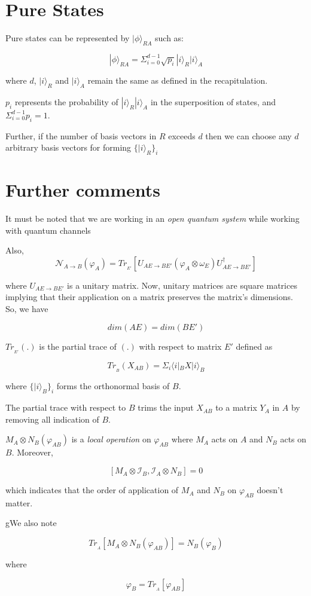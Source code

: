 \documentclass{article}
\begin{document}
\section{Pure States}

Pure states can be represented by $| \phi \rangle _{RA}$ such as:

\[| \phi \rangle _{RA} = \Sigma^{d-1}_{i=0} \sqrt{p_i}| i \rangle_R | i \rangle_A \]

where $d$, $| i \rangle_R$ and $| i \rangle_A$ remain the same as defined in the recapitulation. 

$p_i$ represents the probability of $| i \rangle_R | i \rangle_A$ in the superposition of states, and $\Sigma^{d-1}_{i=0} {p_i} = 1$.

\noindent Further, if the number of basis vectors in $R$ exceeds $d$ then we can choose any $d$ arbitrary basis vectors for forming 
$\{| i \rangle_R \}_i$

\section{Further comments}

\begin{description}

\item It must be noted that we are working in an \emph{open quantum system} while working with quantum channels

\item Also,
\[ \mathcal{N}_{A \rightarrow B}(\varphi_A) = Tr_{_{E'}}[U_{AE \rightarrow BE'} (\varphi_A \otimes \omega_E) U_{AE \rightarrow BE'}^{\dagger} ]\]

where $U_{AE \rightarrow BE'}$ is a unitary matrix. Now, unitary matrices are square matrices implying that their application on a matrix preserves the matrix's dimensions. So, we have

\[dim(AE) = dim(BE')\]

$Tr_{_{E'}}(.)$ is the partial trace of $(.)$ with respect to matrix $E'$ defined as

\[ Tr_{_{B}}(X_{AB}) = \Sigma_i \langle i |_{B} X | i \rangle_{B} \]

where $\{ | i \rangle_{B} \}_i$ forms the orthonormal basis of $B$.

The partial trace with respect to $B$ trims the input $X_{AB}$ to a matrix $Y_A$ in $A$ by removing all indication of $B$.

\item $M_A \otimes N_B (\varphi_{AB})$  is a \emph{local operation} on $\varphi_{AB}$ where $M_A$ acts on $A$ and $N_B$ acts on $B$. Moreover, 

\[ [ M_A \otimes \mathcal{I}_B, \mathcal{I}_A \otimes N_B ] = 0 \]

which indicates that the order of application of $M_A$ and $N_B$ on $\varphi_{AB}$ doesn't matter.

\item gWe also note

\[ Tr_{_A}[M_A \otimes N_B (\varphi_{AB})] = N_B(\varphi_B) \]

where 

\[ \varphi_B = Tr_{_A}[\varphi_{AB}] \]

\end{description}
\end{document}
